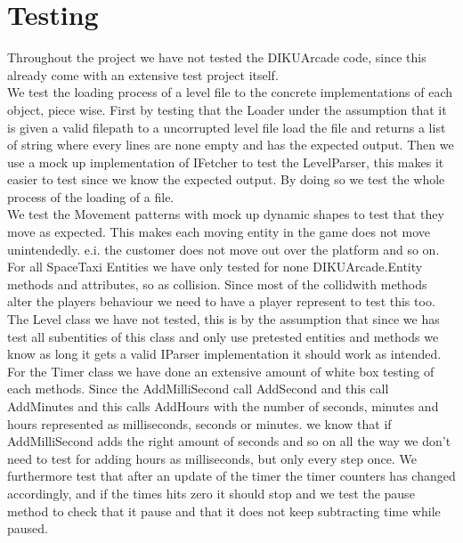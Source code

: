 \documentclass[../master.tex]{subfiles}
\begin{document}
\section{Testing}
Throughout the project we have not tested the DIKUArcade code, since this already come with an extensive test project itself.
\\[10pt]
We test the loading process of a level file to the concrete implementations of each object, piece wise.
First by testing that the Loader under the assumption that it is given a valid filepath to a uncorrupted level file load the file and returns a list of string where every lines are none empty and has the expected output. Then we use a mock up implementation of IFetcher to test the LevelParser, this makes it easier to test since we know the expected output. By doing so we test the whole process of the loading of a file.
\\[10pt]
We test the Movement patterns with mock up dynamic shapes to test that they move as expected. This makes each moving entity in the game does not move unintendedly. e.i. the customer does not move out over the platform and so on.
\\[10pt]
For all SpaceTaxi Entities we have only tested for none DIKUArcade.Entity methods and attributes, so as collision. Since most of the collidwith methods alter the players behaviour we need to have a player represent to test this too.
\\[10pt]
The Level class we have not tested, this is by the assumption that since we has test all subentities of this class and only use pretested entities and methods we know as long it gets a valid IParser implementation it should work as intended.
\\[10pt]
For the Timer class we have done an extensive amount of white box testing of each methods. Since the AddMilliSecond call AddSecond and this call AddMinutes and this calls AddHours with the number of seconds, minutes and hours represented as milliseconds, seconds or minutes. we know that if AddMilliSecond adds the right amount of seconds and so on all the way we don't need to test for adding hours as milliseconds, but only every step once. We furthermore test that after an update of the timer the timer counters has changed accordingly, and if the times hits zero it should stop and we test the pause method to check that it pause and that it does not keep subtracting time while paused.
\end{document}

